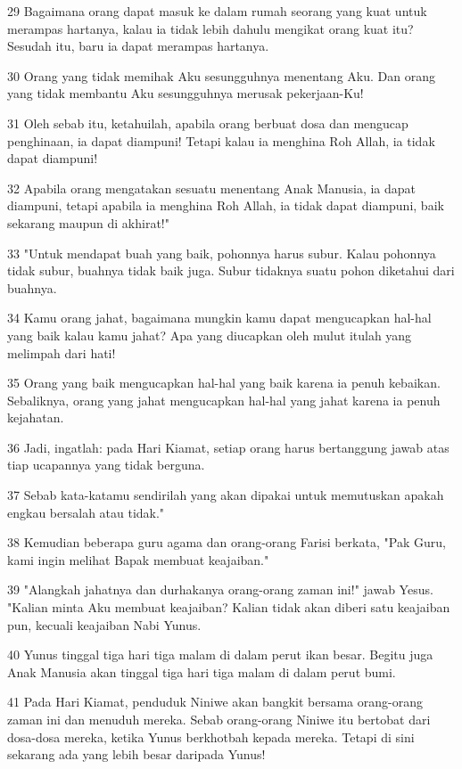 \par 29 Bagaimana orang dapat masuk ke dalam rumah seorang yang kuat untuk merampas hartanya, kalau ia tidak lebih dahulu mengikat orang kuat itu? Sesudah itu, baru ia dapat merampas hartanya.
\par 30 Orang yang tidak memihak Aku sesungguhnya menentang Aku. Dan orang yang tidak membantu Aku sesungguhnya merusak pekerjaan-Ku!
\par 31 Oleh sebab itu, ketahuilah, apabila orang berbuat dosa dan mengucap penghinaan, ia dapat diampuni! Tetapi kalau ia menghina Roh Allah, ia tidak dapat diampuni!
\par 32 Apabila orang mengatakan sesuatu menentang Anak Manusia, ia dapat diampuni, tetapi apabila ia menghina Roh Allah, ia tidak dapat diampuni, baik sekarang maupun di akhirat!"
\par 33 "Untuk mendapat buah yang baik, pohonnya harus subur. Kalau pohonnya tidak subur, buahnya tidak baik juga. Subur tidaknya suatu pohon diketahui dari buahnya.
\par 34 Kamu orang jahat, bagaimana mungkin kamu dapat mengucapkan hal-hal yang baik kalau kamu jahat? Apa yang diucapkan oleh mulut itulah yang melimpah dari hati!
\par 35 Orang yang baik mengucapkan hal-hal yang baik karena ia penuh kebaikan. Sebaliknya, orang yang jahat mengucapkan hal-hal yang jahat karena ia penuh kejahatan.
\par 36 Jadi, ingatlah: pada Hari Kiamat, setiap orang harus bertanggung jawab atas tiap ucapannya yang tidak berguna.
\par 37 Sebab kata-katamu sendirilah yang akan dipakai untuk memutuskan apakah engkau bersalah atau tidak."
\par 38 Kemudian beberapa guru agama dan orang-orang Farisi berkata, "Pak Guru, kami ingin melihat Bapak membuat keajaiban."
\par 39 "Alangkah jahatnya dan durhakanya orang-orang zaman ini!" jawab Yesus. "Kalian minta Aku membuat keajaiban? Kalian tidak akan diberi satu keajaiban pun, kecuali keajaiban Nabi Yunus.
\par 40 Yunus tinggal tiga hari tiga malam di dalam perut ikan besar. Begitu juga Anak Manusia akan tinggal tiga hari tiga malam di dalam perut bumi.
\par 41 Pada Hari Kiamat, penduduk Niniwe akan bangkit bersama orang-orang zaman ini dan menuduh mereka. Sebab orang-orang Niniwe itu bertobat dari dosa-dosa mereka, ketika Yunus berkhotbah kepada mereka. Tetapi di sini sekarang ada yang lebih besar daripada Yunus!
